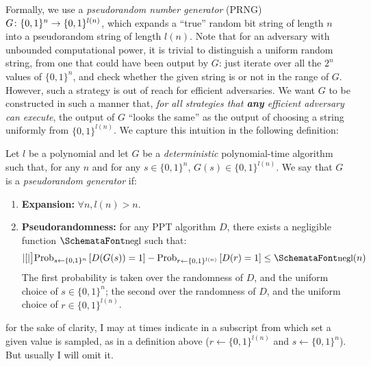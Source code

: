   Formally, we use a \emph{pseudorandom number generator} (PRNG) $G\colon \{0, 1\}^n \rightarrow \{0, 1\}^{l(n)}$, which expands a ``true'' random bit string of length $n$ into a pseudorandom string of length $l(n)$. Note that for an adversary with unbounded computational power, it is trivial to distinguish a uniform random string, from one that could have been output by $G$: just iterate over all the $2^n$ values of $\{0, 1\}^n$, and check whether the given string is or not in the range of $G$. However, such a strategy is out of reach for efficient adversaries. We want $G$ to be constructed in such a manner that, \emph{for all strategies that \textbf{any} efficient adversary can execute}, the output of $G$ ``looks the same'' as the output of choosing a string uniformly from $\{0, 1\}^{l(n)}$. We capture this intuition in the following definition:
  \begin{definition}
    \label{def:prng}
    Let $l$ be a polynomial and let $G$ be a \emph{deterministic} polynomial-time algorithm such that, for any $n$ and for any $s\in \{0, 1\}^n$, $G(s)\in \{0, 1\}^{l(n)}$. We say that $G$ is a \emph{pseudorandom generator} if:
    \begin{enumerate}
      \item \textbf{Expansion:} $\forall n, l(n) > n$.
      \item \textbf{Pseudorandomness:} for any PPT algorithm $D$, there exists a negligible function $\myemph{negl}$ such that:
        \begin{equation}
          \abs*[\big]{\textup{Prob}_{s \leftarrow \{0, 1\}^{n}}\left[D(G(s)) = 1\right] - \textup{Prob}_{r \leftarrow \{0, 1\}^{l(n)}}\left[D(r) = 1\right]} \le \myemph{negl}(n)
        \end{equation}
        The first probability is taken over the randomness of $D$, and the uniform choice of $s\in \{0, 1\}^n$; the second over the randomness of $D$, and the uniform choice of $r\in \{0, 1\}^{l(n)}$.
    \end{enumerate}
  \end{definition}

   for the sake of clarity, I may at times indicate in a subscript from which set a given value is sampled, as in a definition above ($r \leftarrow \{0, 1\}^{l(n)}$ and $s \leftarrow \{0, 1\}^{n}$). But usually I will omit it.

